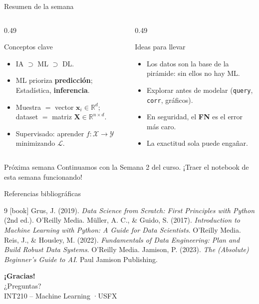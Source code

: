 \documentclass[10pt,aspectratio=169]{beamer}
\begin{document}
\begin{frame}{Resumen de la semana}
  \begin{columns}[T]
    \begin{column}{0.49\textwidth}
      \begin{block}{Conceptos clave}
        \small
        \begin{itemize}
          \item IA $\supset$ ML $\supset$ DL.
          \item ML prioriza \textbf{predicción}; Estadística, \textbf{inferencia}.
          \item Muestra $=$ vector $\mathbf{x}_i\in\mathbb{R}^d$; dataset $=$ matriz $\mathbf{X}\in\mathbb{R}^{n\times d}$.
          \item Supervisado: aprender $f:\mathcal{X}\to\mathcal{Y}$ minimizando $\mathcal{L}$.
        \end{itemize}
      \end{block}
    \end{column}
    \begin{column}{0.49\textwidth}
      \begin{block}{Ideas para llevar}
        \small
        \begin{itemize}
          \item Los datos son la base de la pirámide: sin ellos no hay ML.
          \item Explorar antes de modelar (\texttt{query}, \texttt{corr}, gráficos).
          \item En seguridad, el \textbf{FN} es el error más caro.
          \item La exactitud sola puede engañar.
        \end{itemize}
      \end{block}
    \end{column}
  \end{columns}
  \vfill
  \begin{alertblock}{Próxima semana}
    \centering Continuamos con la Semana 2 del curso. ¡Traer el notebook de esta semana funcionando!
  \end{alertblock}
\end{frame}

\begin{frame}{Referencias bibliográficas}
  \small
  \begin{thebibliography}{9}
    [book]
     Grus, J. (2019).
      \newblock \emph{Data Science from Scratch: First Principles with Python} (2nd ed.).
      \newblock O'Reilly Media.
     Müller, A. C., \& Guido, S. (2017).
      \newblock \emph{Introduction to Machine Learning with Python: A Guide for Data Scientists}.
      \newblock O'Reilly Media.
     Reis, J., \& Housley, M. (2022).
      \newblock \emph{Fundamentals of Data Engineering: Plan and Build Robust Data Systems}.
      \newblock O'Reilly Media.
     Jamison, P. (2023).
      \newblock \emph{The (Absolute) Beginner's Guide to AI}.
      \newblock Paul Jamison Publishing.
  \end{thebibliography}
\end{frame}

\begin{frame}[plain]
  \centering
  \vfill
  {\Huge\bfseries\color{usfxazul} ¡Gracias!}\\[1em]
  {\large ¿Preguntas?}\\[2em]
  \small INT210 -- Machine Learning \quad·\quad USFX
  \vfill
\end{frame}
\end{document}

